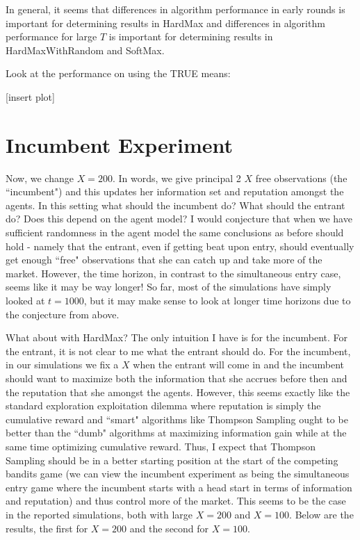\documentclass[11pt,letterpaper]{article}
\begin{document}
In general, it seems that differences in algorithm performance in early rounds is important for determining results in HardMax and differences in algorithm performance for large $T$ is important for determining results in HardMaxWithRandom and SoftMax.

Look at the performance on using the TRUE means:

[insert plot]


\section*{Incumbent Experiment}
Now, we change $X = 200$. In words, we give principal 2 $X$ free observations (the ``incumbent") and this updates her information set and reputation amongst the agents. In this setting what should the incumbent do? What should the entrant do? Does this depend on the agent model? I would conjecture that when we have sufficient randomness in the agent model the same conclusions as before should hold - namely that the entrant, even if getting beat upon entry, should eventually get enough ``free" observations that she can catch up and take more of the market. However, the time horizon, in contrast to the simultaneous entry case, seems like it may be way longer! So far, most of the simulations have simply looked at $t = 1000$, but it may make sense to look at longer time horizons due to the conjecture from above. \\
\vspace{0.25cm}

What about with HardMax? The only intuition I have is for the incumbent. For the entrant, it is not clear to me what the entrant should do. For the incumbent, in our simulations we fix a $X$ when the entrant will come in and the incumbent should want to maximize both the information that she accrues before then and the reputation that she amongst the agents. However, this seems exactly like the standard exploration exploitation dilemma where reputation is simply the cumulative reward and ``smart" algorithms like Thompson Sampling ought to be better than the ``dumb" algorithms at maximizing information gain while at the same time optimizing cumulative reward. Thus, I expect that Thompson Sampling should be in a better starting position at the start of the competing bandits game (we can view the incumbent experiment as being the simultaneous entry game where the incumbent starts with a head start in terms of information and reputation) and thus control more of the market. This seems to be the case in the reported simulations, both with large $X = 200$ and $X = 100$. Below are the results, the first for $X = 200$ and the second for $X = 100$.
\end{document}
